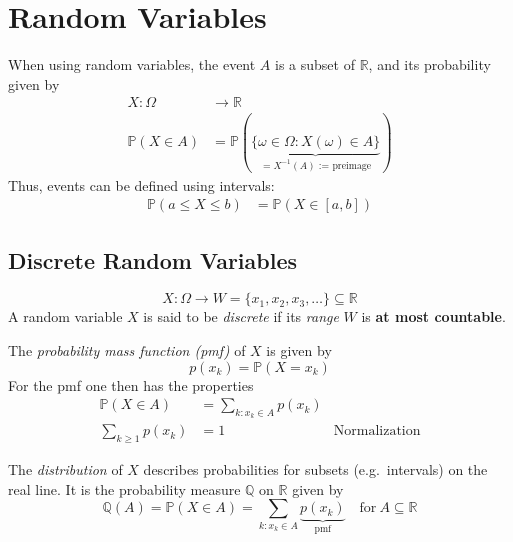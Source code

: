 \section{Random Variables}
When using random variables, the event $A$ is a subset of $\mathbb{R}$, and its probability given by
\noindent\begin{align*}
    X : \Omega         & \rightarrow \mathbb{R}                                                                       \\
    \mathbb{P}(X\in A) & =\mathbb{P}(\underbrace{\{\omega\in\Omega:X(\omega)\in A\}}_{=X^{-1}(A)\text{ := preimage}}) %
\end{align*}
Thus, events can be defined using intervals:
\noindent\begin{align*}
    \mathbb{P}(a\leq X\leq b) & =\mathbb{P}(X\in[a,b])
\end{align*}

\subsection{Discrete Random Variables}
\noindent\begin{equation*}
    X:\Omega\rightarrow W=\{x_1,x_2,x_3,\ldots\}\subseteq\mathbb{R}
\end{equation*}
A random variable $X$ is said to be \textit{discrete} if its \textit{range} $W$ is \textbf{at most countable}.
\newpar{}

The \textit{probability mass function (pmf)} of $X$ is given by
\begin{equation*}
    p(x_{k}) =\mathbb{P}(X=x_{k})
\end{equation*}
For the pmf one then has the properties
\noindent\begin{align*}
    \mathbb{P}(X\in A)  & =\sum_{k:x_k\in A}p(x_k)                        \\
    \sum_{k\geq1}p(x_k) & =1                       & \text{Normalization}
\end{align*}


The \textit{distribution} of $X$ describes probabilities for subsets (e.g.\ intervals) on the real line. It is the probability measure $\mathbb{Q}$ on $\mathbb{R}$ given by
\noindent\begin{equation*}
    \mathbb{Q}(A)=\mathbb{P}(X\in A)=\sum_{k:x_k\in A} \underbrace{p(x_k)}_{\text{pmf}}\quad\mathrm{for~}A\subseteq\mathbb{R}
\end{equation*}

